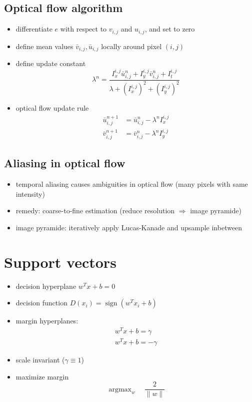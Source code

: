 \documentclass[12pt]{article}
\DeclareMathOperator*{\argmax}{arg max}
\DeclareMathOperator*{\sign}{sign}
\begin{document}
	\subsection{Optical flow algorithm}
	\begin{itemize}
		\item differentiate $e$ with respect to $v_{i,j}$ and $u_{i,j}$, and set to zero
		\item define mean values $\bar{v}_{i,j}, \bar{u}_{i,j}$ locally around pixel $(i,j)$
		\item define update constant
			\begin{equation}
				\lambda^n = \frac{I_x^{i,j} \bar{u}_{i,j}^n + I_y^{i,j} \bar{v}_{i,j}^n + I_t^{i,j} }{\lambda +(I_x^{i,j})^2+ (I_y^{i,j})^2}
			\end{equation}
		\item optical flow update rule
			\begin{align}
				\bar{u}_{i,j}^{n+1} &= \bar{u}_{i,j}^n - \lambda^n I_x^{i,j} \\ \bar{v}_{i,j}^{n+1} &= \bar{v}_{i,j}^n - \lambda^n I_y^{i,j}
			\end{align}
	\end{itemize}
	
	\subsection{Aliasing in optical flow}
	\begin{itemize}
		\item temporal aliasing causes ambiguities in optical flow (many pixels with same intensity)
		\item remedy: coarse-to-fine estimation (reduce resolution $\Rightarrow$ image pyramide)
		\item image pyramide: iteratively apply Lucas-Kanade and upsample inbetween
	\end{itemize}

	\section{Support vectors}
	\begin{itemize}
		\item decision hyperplane $w^Tx + b = 0$
		\item decision function $D(x_i) = \sign(w^Tx_i + b)$
		\item margin hyperplanes:
			\begin{align}
				w^Tx + b = \gamma \\
				w^Tx + b = -\gamma
			\end{align}
		\item scale invariant ($\gamma \equiv 1$)
		\item maximize margin
			\begin{equation}
				\argmax_w \quad \frac{2}{\|w\|}
			\end{equation}
	\end{itemize}
\end{document}
